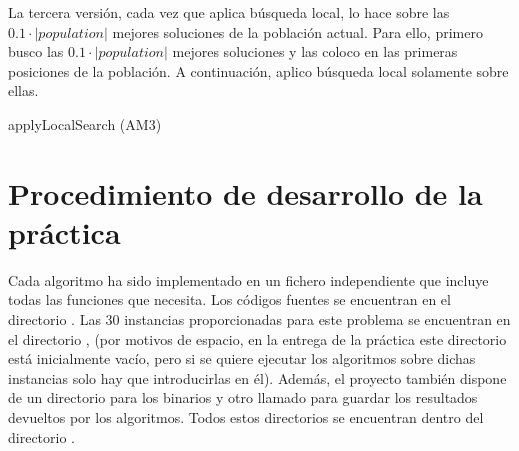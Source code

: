 \documentclass[10pt,a4paper]{article}
\begin{document}
La tercera versión, cada vez que aplica búsqueda local, lo hace sobre las $0.1 \cdot |population|$ mejores soluciones de la población actual. Para ello, primero busco las $0.1 \cdot |population|$ mejores soluciones y las coloco en las primeras posiciones de la población. A continuación, aplico búsqueda local solamente sobre ellas.

\begin{algorithm}[H]
	\caption{applyLocalSearch (AM3)}
\end{algorithm}













\section{Procedimiento de desarrollo de la práctica}

Cada algoritmo ha sido implementado en un fichero independiente que incluye todas las funciones que necesita. Los códigos fuentes se encuentran en el directorio . Las 30 instancias proporcionadas para este problema se encuentran en el directorio , (por motivos de espacio, en la entrega de la práctica este directorio está inicialmente vacío, pero si se quiere ejecutar los algoritmos sobre dichas instancias solo hay que introducirlas en él). Además, el proyecto también dispone de un directorio  para los binarios y otro llamado  para guardar los resultados devueltos por los algoritmos. Todos estos directorios se encuentran dentro del directorio .
\end{document}
